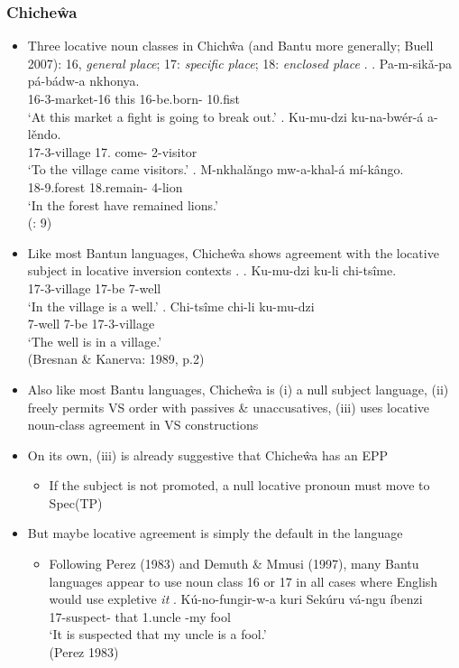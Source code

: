 \documentclass[letterpaper,10pt]{handout_nick}
\begin{document}
\subsubsection{Chiche\^{w}a}
\begin{itemize}
\item Three locative noun classes in Chich\^wa (and Bantu more generally; Buell 2007): 16, \emph{general place}; 17: \emph{specific place}; 18: \emph{enclosed place}
\ex. \ag. Pa-m-sik\v{a}-pa p\'a-b\'adw-a nkhonya.\\
{16-3-market-16 this} 16-be.born- 10.fist\\
`At this market a fight is going to break out.' 
\bg. Ku-mu-dzi ku-na-bw\'er-\'a a-l\v{e}ndo.\\
17-3-village 17. come- 2-visitor\\
`To the village came visitors.'
\bg. M-nkhal\v{a}ngo mw-a-khal-\'a m\'i-k\^ango.\\
18-9.forest 18.remain- 4-lion\\
`In the forest have remained lions.'\\
(\citealt{bresnan89}: 9)

\item Like most Bantun languages, Chiche\^{w}a shows agreement with the locative subject in locative inversion contexts
\ex. \ag. Ku-mu-dzi ku-li chi-ts\^ime.\\
17-3-village 17-be 7-well\\
`In the village is a well.'
\bg. Chi-ts\^ime chi-li ku-mu-dzi\\
7-well 7-be 17-3-village\\
`The well is in a village.'\\
(Bresnan \& Kanerva: 1989, p.2)

\item Also like most Bantu languages, Chiche\^wa is (i) a null subject language, (ii) freely permits VS order with passives \& unaccusatives, (iii) uses locative noun-class agreement in VS constructions 
\item On its own, (iii) is already suggestive that Chiche\^wa has an EPP
\begin{itemize}
\item If the subject is not promoted, a null locative pronoun must move to Spec(TP)
\end{itemize}
\item But maybe locative agreement is simply the default in the language
\begin{itemize}
\item Following Perez (1983) and Demuth \& Mmusi (1997), many Bantu languages appear to use noun class 16 or 17 in all cases where English would use expletive \emph{it}
\exg. K\'u-no-fungir-w-a kuri Sek\'uru v\'a-ngu \'ibenzi\\
17-suspect- that {1.uncle} {-my} fool\\
`It is suspected that my uncle is a fool.'\\
(Perez 1983)


\end{itemize}
\end{itemize}
\end{document}
